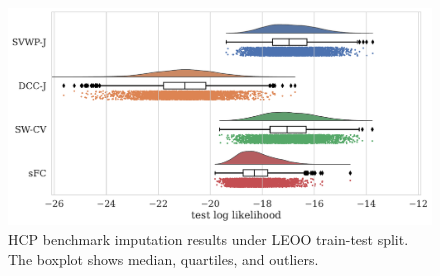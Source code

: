 \begin{figure}[t]
  \centering
  \includegraphics[width=\textwidth]{fig/hcp/d15/imputation_study/LEOO_multivariate_test_log_likelihoods_raincloud}
  \caption{
    HCP benchmark imputation results under LEOO train-test split.
    The boxplot shows median, quartiles, and outliers.
  }
  \label{fig:hcp-results-LEOO-multivariate}
\end{figure}


